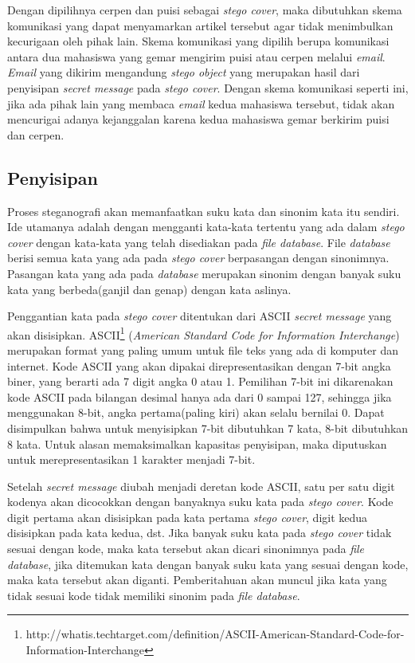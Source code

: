 Dengan dipilihnya cerpen dan puisi sebagai \textit{stego cover}, maka dibutuhkan skema komunikasi yang dapat menyamarkan artikel tersebut agar tidak menimbulkan kecurigaan oleh pihak lain. Skema komunikasi yang dipilih berupa komunikasi antara dua mahasiswa yang gemar mengirim puisi atau cerpen melalui \textit{email}. \textit{Email} yang dikirim mengandung \textit{stego object} yang merupakan hasil dari penyisipan \textit{secret message} pada \textit{stego cover}. Dengan skema komunikasi seperti ini, jika ada pihak lain yang membaca \textit{email} kedua mahasiswa tersebut, tidak akan mencurigai adanya kejanggalan karena kedua mahasiswa gemar berkirim puisi dan cerpen.

\subsection{Penyisipan}
Proses steganografi akan memanfaatkan suku kata dan sinonim kata itu sendiri. Ide utamanya adalah dengan mengganti kata-kata tertentu yang ada dalam \textit{stego cover} dengan kata-kata yang telah disediakan pada \textit{file database}. File \textit{database} berisi semua kata yang ada pada \textit{stego cover} berpasangan dengan sinonimnya. Pasangan kata yang ada pada \textit{database} merupakan sinonim dengan banyak suku kata yang berbeda(ganjil dan genap) dengan kata aslinya.

Penggantian kata pada \textit{stego cover} ditentukan dari ASCII \textit{secret message} yang akan disisipkan. ASCII\footnote{http://whatis.techtarget.com/definition/ASCII-American-Standard-Code-for-Information-Interchange} (\textit{American Standard Code for Information Interchange}) merupakan format yang paling umum untuk file teks yang ada di komputer dan internet. Kode ASCII yang akan dipakai direpresentasikan dengan 7-bit angka biner, yang berarti ada 7 digit angka 0 atau 1. Pemilihan 7-bit ini dikarenakan kode ASCII pada bilangan desimal hanya ada dari 0 sampai 127, sehingga jika menggunakan 8-bit, angka pertama(paling kiri) akan selalu bernilai 0. Dapat disimpulkan bahwa untuk menyisipkan 7-bit dibutuhkan 7 kata, 8-bit dibutuhkan 8 kata.  Untuk alasan memaksimalkan kapasitas penyisipan, maka diputuskan untuk merepresentasikan 1 karakter menjadi 7-bit.

Setelah \textit{secret message} diubah menjadi deretan kode ASCII, satu per satu digit kodenya akan dicocokkan dengan banyaknya suku kata pada \textit{stego cover}. Kode digit pertama akan disisipkan pada kata pertama \textit{stego cover}, digit kedua disisipkan pada kata kedua, dst. Jika banyak suku kata pada \textit{stego cover} tidak sesuai dengan kode, maka kata tersebut akan dicari sinonimnya pada \textit{file database}, jika ditemukan kata dengan banyak suku kata yang sesuai dengan kode, maka kata tersebut akan diganti. Pemberitahuan akan muncul jika kata yang tidak sesuai kode tidak memiliki sinonim pada \textit{file database}.

